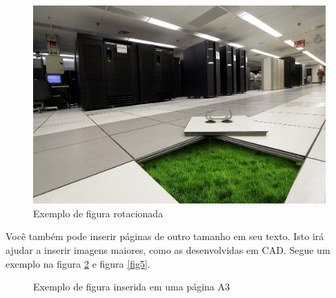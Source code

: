 \documentclass[	DIV=calc,%
							paper=a4,%
							fontsize=12pt,%
							onecolumn]{scrartcl}	 					%
\begin{document}
\begin{figure}
	\centering
	\includegraphics[height=\textwidth,angle=-90]{fig3}
	\caption{Exemplo de figura rotacionada}
	\label{fig3}
\end{figure}

Você também pode inserir páginas de outro tamanho em seu texto. Isto irá ajudar a inserir imagens maiores, como as desenvolvidas em CAD. Segue um exemplo na figura \ref{fig4} e figura \ref{fig5}.


\clearpage
{}
\recalctypearea

\begin{figure}
	\centering
	\caption{Exemplo de figura inserida em uma página A3}
	\label{fig4}
\end{figure}
\end{document}
